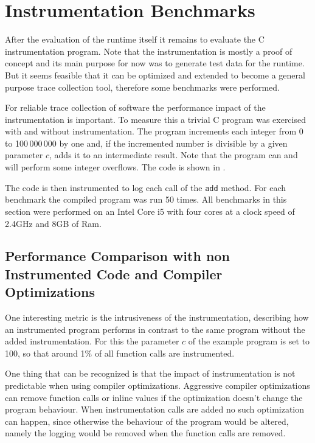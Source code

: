 \section{Instrumentation Benchmarks}
\label{sec:evaluation:instrumentation_benchmarks}

After the evaluation of the runtime itself it remains to evaluate the C instrumentation program.
Note that the instrumentation is mostly a proof of concept and its main purpose for now was to generate test data for the runtime.
But it seems feasible that it can be optimized and extended to become a general purpose trace collection tool, therefore some benchmarks were performed.

For reliable trace collection of software the performance impact of the instrumentation is important.
To measure this a trivial C program was exercised with and without instrumentation.
The program increments each integer from 0 to 100\,000\,000 by one and, if the incremented number is divisible by a given parameter \(c\), adds it to an intermediate result.
Note that the program  can and will perform some integer overflows.
The code is shown in .

\begin{figure}

\end{figure}

The code is then instrumented to log each call of the \lstinline{add} method.
For each benchmark the compiled program was run 50 times.
All benchmarks in this section were performed on an Intel Core i5 with four cores at a clock speed of 2.4GHz and 8GB of Ram.

\subsection{Performance Comparison with non Instrumented Code and Compiler Optimizations}
\label{sec:evaluation:instrumentation_benchmark:instr_vs_non_inst}

One interesting metric is the intrusiveness of the instrumentation, describing how an instrumented program performs in contrast to the same program without the added instrumentation.
For this the parameter \(c\) of the example program is set to 100, so that around 1\% of all function calls are instrumented.

One thing that can be recognized is that the impact of instrumentation is not predictable when using compiler optimizations.
Aggressive compiler optimizations can remove function calls or inline values if the optimization doesn't change the program behaviour.
When instrumentation calls are added no such optimization can happen, since otherwise the behaviour of the program would be altered, namely the logging would be removed when the function calls are removed.

